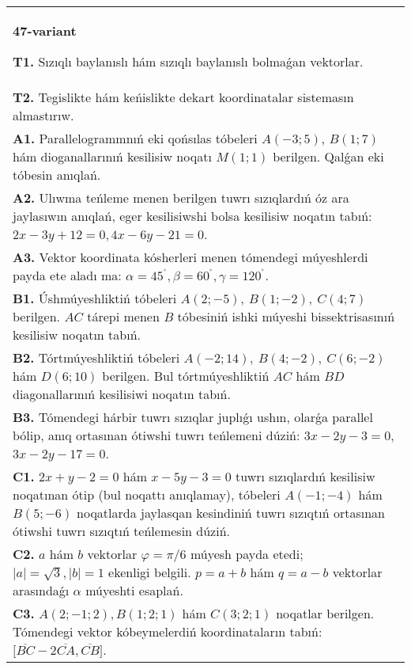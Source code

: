 \documentclass{article}
\begin{document}
\begin{tabular}{m{17cm}}
\textbf{47-variant}

\textbf{T1.} 
Sızıqlı baylanıslı hám sızıqlı baylanıslı bolmaǵan vektorlar.
 \\
\textbf{T2.} 
Tegislikte hám keńislikte dekart koordinatalar sistemasın almastırıw.
 \\
\textbf{A1.} 
Parallelogrammnıń eki qońsılas tóbeleri $A (-3;5) $, $B (1;7) $
hám dioganallarınıń kesilisiw noqatı $M (1;1) $ berilgen. Qalǵan eki
tóbesin anıqlań.
 \\
\textbf{A2.} 
Ulıwma teńleme menen berilgen tuwrı sızıqlardıń
óz ara jaylasıwın anıqlań, eger kesilisiwshi bolsa kesilisiw noqatın
tabıń: $2x-3y+12=0, 4x-6y-21=0$.
 \\
\textbf{A3.} 
Vektor koordinata kósherleri menen tómendegi múyeshlerdi payda ete aladı ma:
$\alpha = 45^{{^\circ}},\beta = 60^{{^\circ}},\gamma = 120^{{^\circ}}$.
 \\
\textbf{B1.} 
Úshmúyeshliktiń tóbeleri \(A (2;-5),\ B (1;-2),\ C (4;7) \)
berilgen. $AC$ tárepi menen $B$ tóbesiniń ishki múyeshi
bissektrisasınıń kesilisiw noqatın tabıń.
 \\
\textbf{B2.} 
Tórtmúyeshliktiń tóbeleri
\(A (-2;14),\ B (4;-2),\ C (6;-2) \) hám \(D (6;10) \) berilgen. Bul
tórtmúyeshliktiń $AC$ hám $BD$ diagonallarınıń kesilisiwi
noqatın tabıń.
 \\
\textbf{B3.} 
Tómendegi hárbir tuwrı sızıqlar juplıǵı ushın, olarǵa parallel
bólip, anıq ortasınan ótiwshi tuwrı teńlemeni dúziń: $3x-2y-3=0$, $3x-2y-17=0$.
 \\
\textbf{C1.} 
\(2x+y-2=0\) hám \(x-5y-3=0\)
tuwrı sızıqlardıń kesilisiw noqatınan ótip (bul noqattı anıqlamay), tóbeleri
\(A (-1;-4) \) hám \(B (5;-6) \) noqatlarda jaylasqan kesindiniń
tuwrı sızıqtıń ortasınan ótiwshi tuwrı sızıqtıń teńlemesin dúziń.
 \\
\textbf{C2.} 
$a$ hám $b$ vektorlar $\varphi = \pi/6$ múyesh payda etedi; $|a| = \sqrt{3},|b| = 1$ ekenligi belgili. $p = a + b$ hám $q = a - b$ vektorlar arasındaǵı $\alpha$ múyeshti esaplań.
 \\
\textbf{C3.} 
$A (2; -1;2), B (1;2; 1) $ hám $C (3;2;1) $ noqatlar berilgen. Tómendegi vektor kóbeymelerdiń koordinataların tabıń:
$\lbrack\overline{BC} - 2\overline{CA},\overline{CB}\rbrack$. \\

\end{tabular}
\vspace{1cm}
\end{document}
